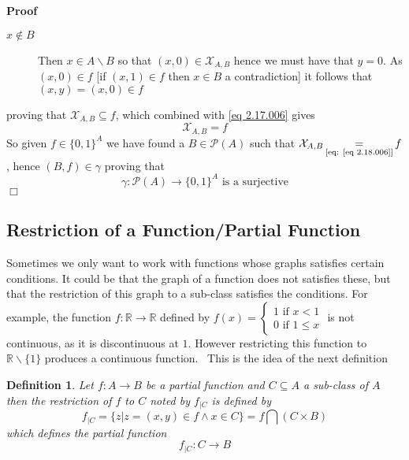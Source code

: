 \documentclass{book}
\newcommand{\equallim}{\mathop{=}\limits}
\newcommand{\nin}{\not\in}
\newenvironment{proof}{\noindent\textbf{Proof\ }}{\hspace*{\fill}$\Box$\medskip}
\newtheorem{definition}{Definition}
{\theorembodyfont{\rmfamily}\newtheorem{example}{Example}}
\begin{document}
\begin{proof}
\begin{description}
    \item[$x \nin B$] Then $x \in A\backslash B$ so that $(x, 0) \in
    \mathcal{X}_{A, B}$ hence we must have that $y = 0$. As $(x, 0) \in f$ [if
    $(x, 1) \in f$ then $x \in B$ a contradiction] it follows that $(x, y) =
    (x, 0) \in f$
  \end{description}
  proving that $\mathcal{X}_{A, B} \subseteq f$, which combined with \ref{eq
  2.17.006} gives
  \begin{equation}
    \label{eq 2.18.006} \mathcal{X}_{A, B} = f
  \end{equation}
  So given $f \in \{ 0, 1 \}^A$ we have found a $B \in \mathcal{P} (A)$ such
  that $\mathcal{X}_{A, B} \equallim_{\text{[eq: \ref{eq 2.18.006}]}} f$,
  hence $(B, f) \in \gamma$ proving that
  \[ \gamma : \mathcal{P} (A) \rightarrow \{ 0, 1 \}^A \text{ is a
     surjective} \]
\end{proof}

\subsection{Restriction of a Function/Partial Function}

Sometimes we only want to work with functions whose graphs satisfies certain
conditions. It could be that the graph of a function does not satisfies these,
but that the restriction of this graph to a sub-class satisfies the
conditions. For example, the function $f : \mathbb{R} \rightarrow \mathbb{R}$
defined by $f (x) = \left\{\begin{array}{l}
  1 \text{ if } x < 1\\
  0 \text{ if } 1 \leqslant x
\end{array}\right.$ is not continuous, as it is discontinuous at $1.$ However
restricting this function to $\mathbb{R}\backslash \{ 1 \}$ produces a
continuous function. \ This is the idea of the next definition

\begin{definition}
  \label{function restriction of a graph}{}Let $f : A
  \rightarrow B$ be a partial function and $C \subseteq A$ a sub-class of $A$
  then the restriction of $f$ to $C$ noted by $f_{|C}$ is defined by
  \[ f_{|C} = \{ z|z = (x, y) \in f \wedge x \in C \} = f \bigcap (C \times B)
  \]
  which defines the partial function
  \[ f_{|C} : C \rightarrow B \]
\end{definition}
\end{document}
